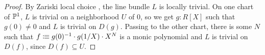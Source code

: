 \begin{proof}
  By Zariski local choice \cite{draft}, the line bundle $L$ is locally trivial.
  On one chart of $\mathbb{P}^1$, $L$ is trivial on a neighborhood $U$ of $0$, so we get $g:R[X]$ such that $g(0)\neq 0$ and $L$ is trivial on $D(g)$.
  Passing to the other chart, there is some $N$ such that $f\vcentcolon\mspace{-1.2mu}\equiv g(0)^{-1}\cdot g(1/X)\cdot X^N$ is a monic polynomial and $L$ is trivial on $D(f)$,
  since $D(f)\subseteq U$.
\end{proof}



